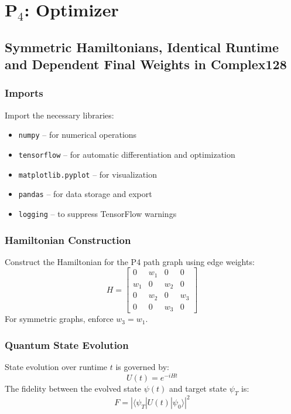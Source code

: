 \documentclass[aps]{revtex4-2}
\begin{document}
\section{P$_4$: Optimizer}
\subsection{Symmetric Hamiltonians, Identical Runtime and Dependent Final Weights in Complex128}
\subsubsection{Imports}
\noindent Import the necessary libraries:
\begin{itemize}
    \item \texttt{numpy} – for numerical operations
    \item \texttt{tensorflow} – for automatic differentiation and optimization
    \item \texttt{matplotlib.pyplot} – for visualization
    \item \texttt{pandas} – for data storage and export
    \item \texttt{logging} – to suppress TensorFlow warnings
\end{itemize}

\subsubsection{Hamiltonian Construction}
\noindent Construct the Hamiltonian for the P4 path graph using edge weights:
\[
H = \begin{bmatrix}
0 & w_1 & 0 & 0 \\
w_1 & 0 & w_2 & 0 \\
0 & w_2 & 0 & w_3 \\
0 & 0 & w_3 & 0
\end{bmatrix}
\]
For symmetric graphs, enforce $w_3 = w_1$.

\subsubsection{Quantum State Evolution}
\noindent State evolution over runtime $t$ is governed by:
\[
U(t) = e^{-i H t}
\]
The fidelity between the evolved state $\psi(t)$ and target state $\psi_T$ is:
\[
F = |\langle \psi_T | U(t) | \psi_0 \rangle|^2
\]
\end{document}
